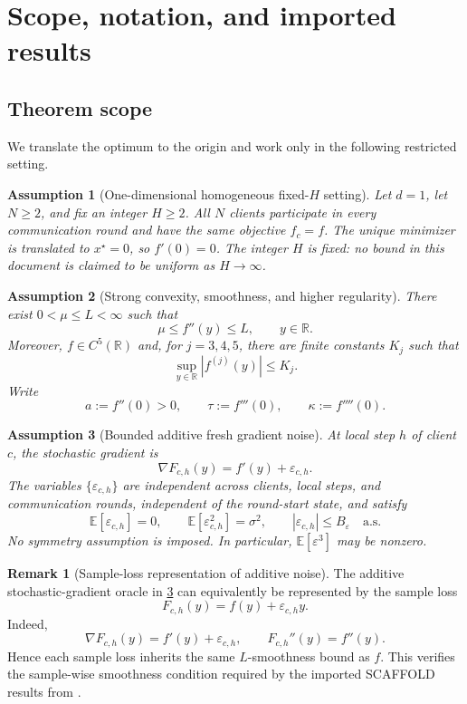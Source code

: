 \documentclass[11pt]{article}
\newtheorem{assumption}{Assumption}
\theoremstyle{definition}
\newtheorem{remark}[remark]{Remark}
\newcommand{\E}{\mathbb{E}}
\newcommand{\R}{\mathbb{R}}
\newcommand{\eps}{\varepsilon}
\begin{document}
\section{Scope, notation, and imported results}
\label{sec:scope}

\subsection{Theorem scope}

We translate the optimum to the origin and work only in the following restricted setting.

\begin{assumption}[One-dimensional homogeneous fixed-$H$ setting]
\label{ass:scope}
Let $d=1$, let $N\ge 2$, and fix an integer $H\ge 2$. All $N$ clients participate in every communication round and have the same objective $f_c=f$. The unique minimizer is translated to $x^\star=0$, so $f'(0)=0$. The integer $H$ is fixed: no bound in this document is claimed to be uniform as $H\to\infty$.
\end{assumption}

\begin{assumption}[Strong convexity, smoothness, and higher regularity]
\label{ass:smooth}
There exist $0<\mu\le L<\infty$ such that
\[
  \mu\le f''(y)\le L,\qquad y\in\R.
\]
Moreover, $f\in C^5(\R)$ and, for $j=3,4,5$, there are finite constants $K_j$ such that
\[
  \sup_{y\in\R}|f^{(j)}(y)|\le K_j.
\]
Write
\[
  a:=f''(0)>0,\qquad \tau:=f'''(0),\qquad \kappa:=f''''(0).
\]
\end{assumption}

\begin{assumption}[Bounded additive fresh gradient noise]
\label{ass:noise}
At local step $h$ of client $c$, the stochastic gradient is
\[
  \nabla F_{c,h}(y)=f'(y)+\eps_{c,h}.
\]
The variables $\{\eps_{c,h}\}$ are independent across clients, local steps, and communication rounds, independent of the round-start state, and satisfy
\[
  \E[\eps_{c,h}]=0,\qquad
  \E[\eps_{c,h}^2]=\sigma^2,\qquad
  |\eps_{c,h}|\le B_\eps\quad\text{a.s.}
\]
No symmetry assumption is imposed. In particular, $\E[\eps^3]$ may be nonzero.
\end{assumption}

\begin{remark}[Sample-loss representation of additive noise]
The additive stochastic-gradient oracle in \cref{ass:noise} can equivalently be represented by the sample loss
\[
  F_{c,h}(y)=f(y)+\eps_{c,h}y.
\]
Indeed,
\[
  \nabla F_{c,h}(y)=f'(y)+\eps_{c,h},
  \qquad
  F_{c,h}''(y)=f''(y).
\]
Hence each sample loss inherits the same $L$-smoothness bound as $f$. This verifies the sample-wise smoothness condition required by the imported SCAFFOLD results from \citet{mangold2025scaffold}.
\end{remark}
\end{document}
